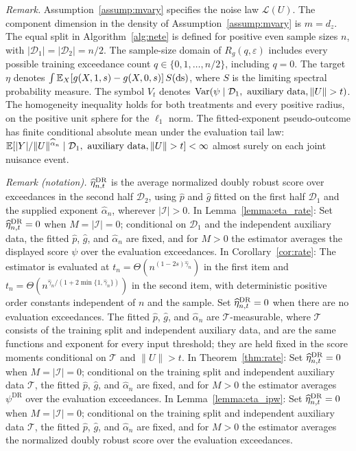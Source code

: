 \documentclass[12pt]{article}
\theoremstyle{plain}
\theoremstyle{definition}
\begin{document}
\noindent\textit{Remark.} Assumption~\ref{assump:mvary} specifies the noise law $\mathcal L(U)$. The component dimension in the density of Assumption~\ref{assump:mvary} is $m=d_z$. The equal split in Algorithm~\ref{alg:nete} is defined for positive even sample sizes $n$, with $|\mathcal D_1|=|\mathcal D_2|=n/2$. The sample-size domain of $R_g(q,\varepsilon)$ includes every possible training exceedance count $q\in\{0,1,\ldots,n/2\}$, including $q=0$. The target $\eta$ denotes $\int\mathbb E_X[g(X,1,s)-g(X,0,s)]\,S(\operatorname{ds})$, where $S$ is the limiting spectral probability measure. The symbol $V_t$ denotes $\tmop{Var}(\psi\mid\mathcal D_1,\hbox{ auxiliary data},\|U\|>t)$. The homogeneity inequality holds for both treatments and every positive radius, on the positive unit sphere for the $\ell_1$ norm. The fitted-exponent pseudo-outcome has finite conditional absolute mean under the evaluation tail law: $\mathbb E[|Y|/\|U\|^{\hat\alpha_n}\mid\mathcal D_1,\hbox{ auxiliary data},\|U\|>t]<\infty$ almost surely on each joint nuisance event.

\noindent\textit{Remark (notation).} $\widehat\eta_{n,t}^{\operatorname{DR}}$ is the average normalized doubly robust score over exceedances in the second half $\mathcal{D}_2$, using $\hat p$ and $\hat g$ fitted on the first half $\mathcal{D}_1$ and the supplied exponent $\hat\alpha_n$, wherever $|\mathcal{I}|>0$. In Lemma~\ref{lemma:eta_rate}: Set $\widehat\eta_{n,t}^{\operatorname{DR}}=0$ when $M=|\mathcal I|=0$; conditional on $\mathcal D_1$ and the independent auxiliary data, the fitted $\hat p$, $\hat g$, and $\hat\alpha_n$ are fixed, and for $M>0$ the estimator averages the displayed score $\psi$ over the evaluation exceedances. In Corollary~\ref{cor:rate}: The estimator is evaluated at $t_n=\Theta(n^{(1-2s)\hat\gamma_n})$ in the first item and $t_n=\Theta(n^{\hat\gamma_n/(1+2\min\{1,\hat\gamma_n\})})$ in the second item, with deterministic positive order constants independent of $n$ and the sample. Set $\widehat\eta_{n,t}^{\operatorname{DR}}=0$ when there are no evaluation exceedances. The fitted $\hat p$, $\hat g$, and $\hat\alpha_n$ are $\mathcal T$-measurable, where $\mathcal T$ consists of the training split and independent auxiliary data, and are the same functions and exponent for every input threshold; they are held fixed in the score moments conditional on $\mathcal T$ and $\|U\|>t$. In Theorem~\ref{thm:rate}: Set $\widehat\eta_{n,t}^{\operatorname{DR}}=0$ when $M=|\mathcal I|=0$; conditional on the training split and independent auxiliary data $\mathcal T$, the fitted $\hat p$, $\hat g$, and $\hat\alpha_n$ are fixed, and for $M>0$ the estimator averages $\psi^{\mathrm{DR}}$ over the evaluation exceedances. In Lemma~\ref{lemma:eta_ipw}: Set $\widehat\eta_{n,t}^{\operatorname{DR}}=0$ when $M=|\mathcal I|=0$; conditional on the training split and independent auxiliary data $\mathcal T$, the fitted $\hat p$, $\hat g$, and $\hat\alpha_n$ are fixed, and for $M>0$ the estimator averages the normalized doubly robust score over the evaluation exceedances.
\end{document}
